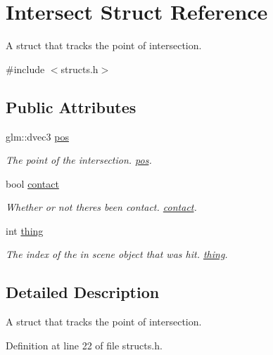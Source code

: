 \hypertarget{struct_intersect}{}\section{Intersect Struct Reference}
\label{struct_intersect}


A struct that tracks the point of intersection.  




{\ttfamily \#include $<$structs.\+h$>$}

\subsection*{Public Attributes}
\begin{DoxyCompactItemize}
\item 
glm\+::dvec3 \mbox{\hyperlink{struct_intersect_a3af8689bbf10550451c0512186727d03}{pos}}
\begin{DoxyCompactList}\small\item\em The point of the intersection. \mbox{\hyperlink{struct_intersect_a3af8689bbf10550451c0512186727d03}{pos}}. \end{DoxyCompactList}\item 
bool \mbox{\hyperlink{struct_intersect_a804dc874077e6140a02aeddcfa992892}{contact}}
\begin{DoxyCompactList}\small\item\em Whether or not there\textquotesingle{}s been contact. \mbox{\hyperlink{struct_intersect_a804dc874077e6140a02aeddcfa992892}{contact}}. \end{DoxyCompactList}\item 
int \mbox{\hyperlink{struct_intersect_a0db00f51f704942fd24de64379a74c28}{thing}}
\begin{DoxyCompactList}\small\item\em The index of the in scene object that was hit. \mbox{\hyperlink{struct_intersect_a0db00f51f704942fd24de64379a74c28}{thing}}. \end{DoxyCompactList}\end{DoxyCompactItemize}


\subsection{Detailed Description}
A struct that tracks the point of intersection. 

Definition at line 22 of file structs.\+h.




